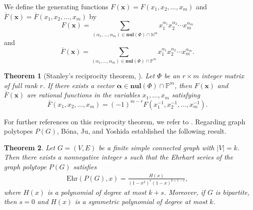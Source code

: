 \documentclass[reqno, 12pt]{amsart}
\newtheorem{thm}{Theorem}[section]
\theoremstyle{mydefinition}
\theoremstyle{myremark}
\begin{document}
We define the generating functions $F(\mathbf{x}) = F(x_1, x_2, \ldots, x_m)$ and $\overline{F}(\mathbf{x}) = \overline{F}(x_1, x_2, \ldots, x_m)$ by
\[
F(\mathbf{x}) = \sum_{(\alpha_1, \ldots, \alpha_m) \in \textbf{nul}(\Phi) \cap \mathbb{N}^m} x_1^{\alpha_1} x_2^{\alpha_2} \cdots x_m^{\alpha_m}
\]
and
\[
\overline{F}(\mathbf{x}) = \sum_{(\alpha_1, \ldots, \alpha_m) \in \textbf{nul}(\Phi) \cap \mathbb{P}^m} x_1^{\alpha_1} x_2^{\alpha_2} \cdots x_m^{\alpha_m}.
\]

\begin{thm}[Stanley's reciprocity theorem, \cite{StanleyMagic73}]\label{StanleyReciprocity}
Let $\Phi$ be an $r \times m$ integer matrix of full rank $r$. If there exists a vector $\boldsymbol{\alpha} \in \mathbf{nul}(\Phi) \cap \mathbb{P}^m$, then $F(\mathbf{x})$ and $\overline{F}(\mathbf{x})$ are rational functions in the variables $x_1, \dots, x_m$ satisfying
\[
\overline{F}(x_1, x_2, \ldots, x_m) = (-1)^{m-r} F(x_1^{-1}, x_2^{-1}, \ldots, x_m^{-1}).
\]
\end{thm}

For further references on this reciprocity theorem, we refer to \cite{StanleyReci74,XinReci07}.
Regarding graph polytopes $P(G)$, B\'ona, Ju, and Yoshida \cite{BonaJu07} established the following result.


\begin{thm}\cite{BonaJu07}\label{GraphPolyBonaJu}
Let $G = (V, E)$ be a finite simple connected graph with $|V| = k$. Then there exists a nonnegative integer $s$ such that the Ehrhart series of the graph polytope $P(G)$ satisfies
\begin{align}\label{Ehrhart-Series-PG}
\mathrm{Ehr}(P(G), x) = \frac{H(x)}{(1 - x^2)^s (1 - x)^{k + 1 - s}},
\end{align}
where $H(x)$ is a polynomial of degree at most $k + s$. Moreover, if $G$ is bipartite, then $s = 0$ and $H(x)$ is a symmetric polynomial of degree at most $k$.
\end{thm}
\end{document}
